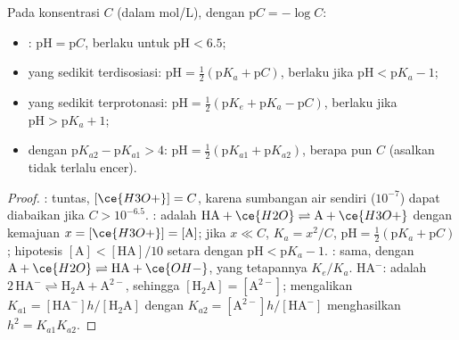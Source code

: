 \begin{proposition}\label{prop:b1:predominant-reaction:ph-formulas}
Pada konsentrasi $C$ (dalam \unit{mol/L}), dengan $\mathrm{p}C = -\log C$:
\begin{itemize}
  \item {}: $\mathrm{pH} = \mathrm{p}C$, berlaku untuk
        $\mathrm{pH} < 6.5$;
  \item {} yang sedikit terdisosiasi: $\mathrm{pH} = \frac12(\mathrm{p}K_a
        + \mathrm{p}C)$, berlaku jika $\mathrm{pH} < \mathrm{p}K_a - 1$;
  \item {} yang sedikit terprotonasi: $\mathrm{pH} = \frac12(\mathrm{p}K_e +
        \mathrm{p}K_a - \mathrm{p}C)$, berlaku jika $\mathrm{pH} > \mathrm{p}K_a +
        1$;
  \item {} dengan $\mathrm{p}K_{a2} - \mathrm{p}K_{a1} > 4$:
        $\mathrm{pH} = \frac12(\mathrm{p}K_{a1} + \mathrm{p}K_{a2})$,
        berapa pun $C$ (asalkan tidak terlalu encer).
\end{itemize}
\end{proposition}

\begin{proof}
:  tuntas, $[\ce{H3O+}] = C$, karena
sumbangan air sendiri ($10^{-7}$) dapat diabaikan jika $C > 10^{-6.5}$.
:  adalah $\mathrm{HA} + \ce{H2O}
\rightleftharpoons \mathrm{A} + \ce{H3O+}$ dengan kemajuan $x = [\ce{H3O+}]
= [\mathrm{A}]$; jika $x \ll C$, $K_a = x^2/C$, $\mathrm{pH} = \frac12(\mathrm{p}K_a
+ \mathrm{p}C)$; hipotesis $[\mathrm{A}] < [\mathrm{HA}]/10$ setara dengan
$\mathrm{pH} < \mathrm{p}K_a - 1$. : sama, dengan $\mathrm{A} +
\ce{H2O} \rightleftharpoons \mathrm{HA} + \ce{OH-}$, yang tetapannya $K_e/K_a$.
 HA$^-$:  adalah $2\,\mathrm{HA}^- \rightleftharpoons
\mathrm{H_2A} + \mathrm{A}^{2-}$, sehingga $[\mathrm{H_2A}] = [\mathrm{A}^{2-}]$;
mengalikan $K_{a1} = [\mathrm{HA}^-]h/[\mathrm{H_2A}]$ dengan $K_{a2} =
[\mathrm{A}^{2-}]h/[\mathrm{HA}^-]$ menghasilkan $h^2 = K_{a1}K_{a2}$.
\end{proof}

